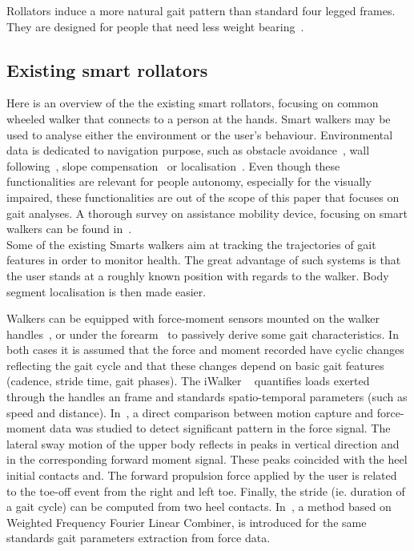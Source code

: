 \documentclass[letterpaper, 10 pt, conference]{ieeeconf}
\begin{document}
Rollators induce a more natural gait pattern than standard four legged frames. They are designed for people that need less weight bearing~\cite{VanHook03}.

\subsection{Existing smart rollators}

Here is an overview of the the existing smart rollators, focusing on common wheeled walker that connects to a person at the hands. Smart walkers may be used to analyse either the environment or  the user's behaviour. Environmental data is dedicated to navigation purpose, such as obstacle avoidance~\cite{Spenko06}, wall following~\cite{Yu2003}, slope compensation~\cite{Hirata2007} or localisation~\cite{Kotani1996,MacNamara00}. Even though these functionalities are relevant for people autonomy, especially for the visually impaired, these functionalities are out of the scope of this paper that focuses on gait analyses. A thorough survey on assistance mobility device, focusing on smart walkers can be found in~\cite{Frizera08,Martins11}.\\

Some of the existing Smarts walkers aim at tracking the trajectories of gait features in order to monitor health. The great advantage of such systems is that the user stands at a roughly known position with regards to the walker. Body segment localisation is then made easier.

Walkers can be equipped with force-moment sensors mounted on the walker handles~\cite{Alwan07,Tung10}, or under the forearm~\cite{Frizera08,Frizera10b} to passively derive some gait characteristics. In both cases it is assumed that the force and moment recorded have cyclic changes reflecting the gait cycle and that these changes depend on basic gait features (cadence, stride time, gait phases).  The iWalker ~\cite{Tung10} quantifies loads exerted through the handles an frame and standards spatio-temporal parameters (such as speed and distance). In~\cite{Alwan07}, a direct comparison between motion capture and force-moment data was studied to detect significant pattern in the force signal. The lateral sway motion of the upper body reflects in peaks in vertical direction and in the corresponding forward moment signal. These peaks coincided with the heel initial contacts and. The forward propulsion force applied by the user is related to the toe-off event from the right and left toe. Finally, the stride (ie. duration of a gait cycle) can be computed from two heel contacts. In~\cite{Frizera10b}, a method based on Weighted Frequency Fourier Linear Combiner, is introduced for the same standards gait parameters extraction from force data.
\end{document}
